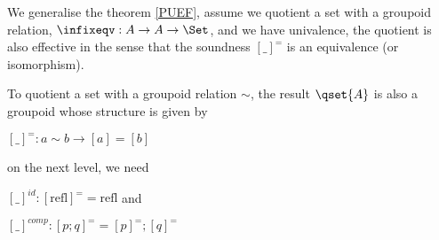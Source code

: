 

\begin{corollary}
We generalise the theorem \ref{PUEF}, assume we quotient a set with a groupoid relation, $\infixeqv: A \to A \to
\Set$, and we have univalence, the quotient is also effective in the sense that the soundness $[\_]^{=}$ is an equivalence (or isomorphism).
\end{corollary}

To quotient a set with a groupoid relation $\sim$, the result $\qset{A}$ is also a groupoid whose structure is given by 

$[\_]^{=} : a \sim b \to [a] = [b]$

on the next level, we need

$[\_]^{id}: [ \text{refl} ]^{=} = \text{refl}$ and

$[\_]^{comp}: [ p ; q ]^{=} =  [ p ]^{=} ; [ q ]^{=} $


